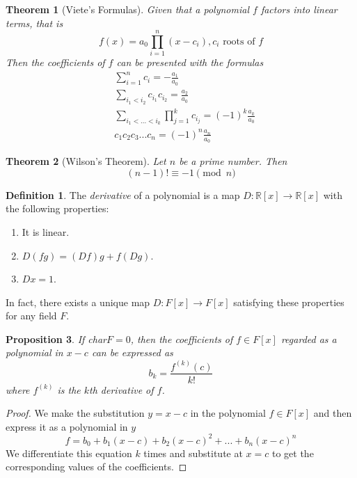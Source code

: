 \documentclass{article}
\newtheorem{theorem}{Theorem}[section]
\newtheorem{proposition}[theorem]{Proposition}
\theoremstyle{remark}
\theoremstyle{definition}
\newtheorem{definition}{Definition}[section]
\begin{document}
\begin{theorem}[Viete's Formulas]
Given that a polynomial $f$ factors into linear terms, that is 
\[f(x) = a_0 \prod_{i = 1}^{n} (x - c_i), c_i \text{ roots of } f\]
Then the coefficients of $f$ can be presented with the formulas
\begin{align*}
    & \sum_{i=1}^n c_i = - \frac{a_1}{a_0} \\
    & \sum_{i_1 < i_2} c_{i_1} c_{i_2} = \frac{a_2}{a_0} \\
    & \sum_{i_1< ...< i_k} \prod_{j = 1}^{k} c_{i_j} = (-1)^k \frac{a_k}{a_0} \\
    & c_1 c_2 c_3 ... c_n = (-1)^n \frac{a_n}{a_0}
\end{align*}
\end{theorem}

\begin{theorem}[Wilson's Theorem]
Let $n$ be a prime number. Then 
\[ (n-1)! \equiv -1 \pmod{n}\]
\end{theorem}

\begin{definition}
The \textit{derivative} of a polynomial is a map $D: \mathbb{R}[x] \longrightarrow \mathbb{R}[x]$ with the following properties:
\begin{enumerate}
    \item It is linear. 
    \item $D(f g) = (D f) g + f (D g)$. 
    \item $D x = 1$. 
\end{enumerate}
\end{definition}

In fact, there exists a unique map $D: F[x] \longrightarrow F[x]$ satisfying these properties for any field $F$. 

\begin{proposition}
If char$F = 0$, then the coefficients of $f \in F[x]$ regarded as a polynomial in $x - c$ can be expressed as 
\begin{equation}
    b_k = \frac{ f^{(k)} (c)}{k!}
\end{equation}
where $f^{(k)}$ is the $k$th derivative of $f$. 
\end{proposition}
\begin{proof}
We make the substitution $ y = x-c$ in the polynomial $f \in F[x]$ and then express it as a polynomial in $y$ 
\begin{equation}
    f = b_0 + b_1 (x-c) + b_2 (x-c)^2 + ... + b_n (x-c)^n
\end{equation}
We differentiate this equation $k$ times and substitute at $x = c$ to get the corresponding values of the coefficients.
\end{proof}
\end{document}

